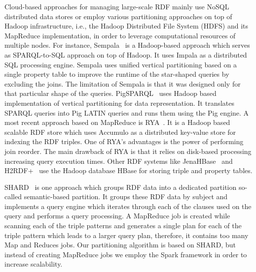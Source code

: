 Cloud-based approaches for managing large-scale RDF mainly use NoSQL distributed data stores or employ various partitioning approaches on top of Hadoop infrastructure, i.e., the Hadoop Distributed File System (HDFS) and its MapReduce implementation, in order to leverage computational resources of multiple nodes. 
For instance, Sempala~\cite{Schatzle2014Sempala} is a Hadoop-based approach which serves as SPARQL-to-SQL approach on top of Hadoop.
It uses Impala as a distributed SQL processing engine. 
Sempala uses unified vertical partitioning based on a single property table to improve the runtime of the star-shaped queries by excluding the joins. 
The limitation of Sempala is that it was designed only for that particular shape of the queries.
PigSPARQL~\cite{Schatzle2011PMS} uses Hadoop based implementation of vertical partitioning for data representation. 
It translates SPARQL queries into Pig LATIN queries and runs them using the Pig engine.
A most recent approach based on MapReduce is RYA~\cite{Punnoose2012Rya}.
It is a Hadoop based scalable RDF store which uses Accumulo as a distributed key-value store for indexing the RDF triples.
One of RYA's advantages is the power of performing join reorder. 
The main drawback of RYA is that it relies on disk-based processing increasing query execution times.
Other RDF systems like JenaHBase~\cite{KhadilkarKTC2012} and H2RDF+~\cite{PapailiouKTKK13} use the Hadoop database HBase for storing triple and property tables.

SHARD~\cite{Rohloff2010SHARD} is one approach which groups RDF data into a dedicated partition so-called semantic-based partition.  
It groups these RDF data by subject and implements a query engine which iterates through each of the clauses used on the query and performs a query processing. 
A MapReduce job is created while scanning each of the triple patterns and generates a single plan for each of the triple pattern which leads to a larger query plan, therefore, it contains too many Map and Reduces jobs. 
Our partitioning algorithm is based on SHARD, but instead of creating MapReduce jobs we employ the Spark framework in order to increase scalability.

